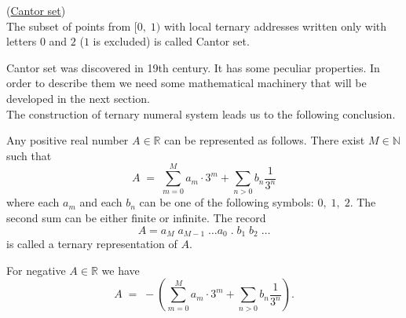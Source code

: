 \documentclass[color=black,11pt]{elegantpaper}
\begin{document}
\begin{definition}(\href{https://en.wikipedia.org/wiki/Cantor_set}{Cantor set})\\
The subset of points from $[0,\;1)$ with local ternary addresses written only with letters $0$ and $2$ ($1$ is excluded) is called Cantor set.
\end{definition}
Cantor set was discovered in 19th century. It has some peculiar properties. In order to describe them we need some mathematical machinery that will be developed in the next section.\\
The construction of ternary numeral system leads us to the following conclusion.
\begin{theorem}
Any positive real number $A \in \mathbb{R}$ can be represented as follows. There exist $M \in \mathbb{N}$ such that
$$
 A \;=\; \sum_{m= 0}^M a_m \cdot 3^m + \sum_{n > 0}b_n \frac{1}{3^n} 
$$
where each $a_m$ and each $b_n$ can be one of the following symbols:  $0,\;1,\;2.$  The second sum can be either finite or infinite. The record 
$$
A = a_M \; a_{M-1}\; \dots a_0\;.\;b_1\; b_2 \;\dots 
$$
is called a ternary representation of $A.$
\end{theorem}
For negative $A \in \mathbb{R}$ we have
$$
 A \;=\;- (\sum_{m= 0}^M a_m \cdot 3^m + \sum_{n > 0}b_n \frac{1}{3^n}).
$$



\end{document}
